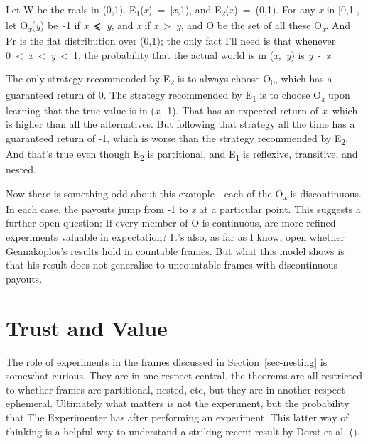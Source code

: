 \documentclass[
  11pt,
  letterpaper,
  DIV=11,
  numbers=noendperiod,
  twoside]{scrartcl}
\begin{document}
Let W be the reals in (0,1).
E\textsubscript{1}(\emph{x})~=~{[}\emph{x},1), and
E\textsubscript{2}(\emph{x})~=~(0,1). For any \emph{x} in {[}0,1{]}, let
O\textsubscript{\emph{x}}(\emph{y}) be~-1 if \emph{x}~⩽~\emph{y}, and
\emph{x} if \emph{x}~\textgreater~\emph{y}, and O be the set of all
these O\textsubscript{\emph{x}}. And Pr is the flat distribution over
(0,1); the only fact I'll need is that whenever
0~\textless~\emph{x}~\textless~\emph{y}~\textless~1, the probability
that the actual world is in (\emph{x},~\emph{y}) is \emph{y}~-~\emph{x}.

The only strategy recommended by E\textsubscript{2} is to always choose
O\textsubscript{0}, which has a guaranteed return of 0. The strategy
recommended by E\textsubscript{1} is to choose O\textsubscript{\emph{x}}
upon learning that the true value is in (\emph{x},~1). That has an
expected return of \emph{x}, which is higher than all the alternatives.
But following that strategy all the time has a guaranteed return of -1,
which is worse than the strategy recommended by E\textsubscript{2}. And
that's true even though E\textsubscript{2} is partitional, and
E\textsubscript{1} is reflexive, transitive, and nested.

Now there is something odd about this example - each of the
O\textsubscript{\emph{x}} is discontinuous. In each case, the payouts
jump from -1 to \emph{x} at a particular point. This suggests a further
open question: If every member of O is continuous, are more refined
experiments valuable in expectation? It's also, as far as I know, open
whether Geanakoplos's results hold in countable frames. But what this
model shows is that his result does not generalise to uncountable frames
with discontinuous payouts.

\section{Trust and Value}\label{sec-dorst}

The role of experiments in the frames discussed in
Section~\ref{sec-nesting} is somewhat curious. They are in one respect
central, the theorems are all restricted to whether frames are
partitional, nested, etc, but they are in another respect ephemeral.
Ultimately what matters is not the experiment, but the probability that
The Experimenter has after performing an experiment. This latter way of
thinking is a helpful way to understand a striking recent result by
Dorst et al. ().
\end{document}
